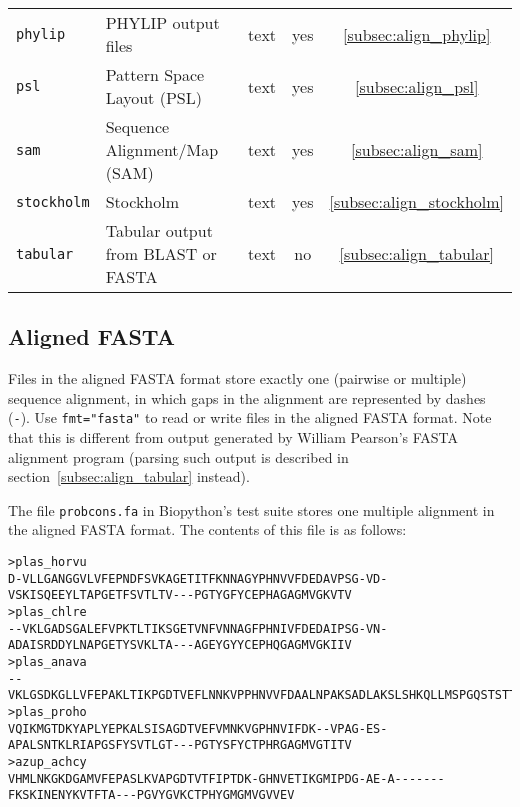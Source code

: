 \begin{table}[!htbp]
\begin{center}
\begin{tabular}{|l|l|c|c|c|}
\verb|phylip| & PHYLIP output files & text & yes & \ref{subsec:align_phylip} \\
\verb|psl| & Pattern Space Layout (PSL) & text & yes & \ref{subsec:align_psl} \\
\verb|sam| & Sequence Alignment/Map (SAM) & text & yes & \ref{subsec:align_sam} \\
\verb|stockholm| & Stockholm & text & yes & \ref{subsec:align_stockholm} \\
\verb|tabular| & Tabular output from BLAST or FASTA & text & no & \ref{subsec:align_tabular} \\
\end{tabular}
\end{center}
\end{table}

\subsection{Aligned FASTA}
\label{subsec:align_fasta}

Files in the aligned FASTA format store exactly one (pairwise or multiple) sequence alignment, in which gaps in the alignment are represented by dashes (\verb|-|). Use \verb|fmt="fasta"| to read or write files in the aligned FASTA format. Note that this is different from output generated by William Pearson's FASTA alignment program (parsing such output is described in section~\ref{subsec:align_tabular} instead).

The file \verb+probcons.fa+ in Biopython's test suite stores one multiple alignment in the aligned FASTA format. The contents of this file is as follows:
\begin{verbatim}
>plas_horvu
D-VLLGANGGVLVFEPNDFSVKAGETITFKNNAGYPHNVVFDEDAVPSG-VD-VSKISQEEYLTAPGETFSVTLTV---PGTYGFYCEPHAGAGMVGKVTV
>plas_chlre
--VKLGADSGALEFVPKTLTIKSGETVNFVNNAGFPHNIVFDEDAIPSG-VN-ADAISRDDYLNAPGETYSVKLTA---AGEYGYYCEPHQGAGMVGKIIV
>plas_anava
--VKLGSDKGLLVFEPAKLTIKPGDTVEFLNNKVPPHNVVFDAALNPAKSADLAKSLSHKQLLMSPGQSTSTTFPADAPAGEYTFYCEPHRGAGMVGKITV
>plas_proho
VQIKMGTDKYAPLYEPKALSISAGDTVEFVMNKVGPHNVIFDK--VPAG-ES-APALSNTKLRIAPGSFYSVTLGT---PGTYSFYCTPHRGAGMVGTITV
>azup_achcy
VHMLNKGKDGAMVFEPASLKVAPGDTVTFIPTDK-GHNVETIKGMIPDG-AE-A-------FKSKINENYKVTFTA---PGVYGVKCTPHYGMGMVGVVEV
\end{verbatim}

